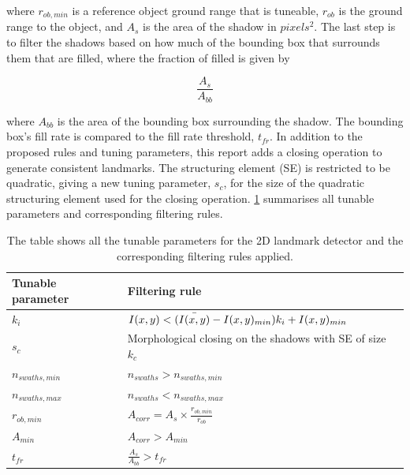 where $r_{ob, min}$ is a reference object ground range that is tuneable, $r_{ob}$ is the ground range to the object, and $A_s$ is the area of the shadow in $pixels^2$. The last step is to filter the shadows based on how much of the bounding box that surrounds them that are filled, where the fraction of filled is given by

\begin{equation}
    \frac{A_s}{A_{bb}}
    \label{eq:fill_rate_bb}
\end{equation}

where $A_{bb}$ is the area of the bounding box surrounding the shadow. The bounding box's fill rate is compared to the fill rate threshold, $t_{fr}$. In addition to the proposed rules and tuning parameters, this report adds a closing operation to generate consistent landmarks. The structuring element (SE) is restricted to be quadratic, giving a new tuning parameter, $s_c$, for the size of the quadratic structuring element used for the closing operation. \cref{tab:2D_tuning_rules} summarises all tunable parameters and corresponding filtering rules. 

\begin{table}
    \begin{center}
    \caption{The table shows all the tunable parameters for the 2D landmark detector and the corresponding filtering rules applied.}
    \begin{tabular}{ll}
        \hline
        \textbf{Tunable parameter} & \textbf{Filtering rule}                            \\ \hline
        $k_i$             & $I(x,y) < (\Bar{I(x,y)} - I(x,y)_{min}) k_i + I(x,y)_{min}$ \\ 
        $s_c$             & Morphological closing on the shadows with SE of size $k_c$  \\ 
        $n_{swaths,min}$  & $n_{swaths} > n_{swaths,min}$                               \\ 
        $n_{swaths,max}$  & $n_{swaths} < n_{swaths,max}$                               \\ 
        $r_{ob,min}$      & $A_{corr} = A_s \times \frac{r_{ob,min}}{r_{ob}}$           \\ 
        $A_{min}$         & $A_{corr} > A_{min}$                                        \\ 
        $t_{fr}$          & $\frac{A_s}{A_{bb}} > t_{fr}$                               \\ 
        \hline
    \end{tabular}
    \end{center}
    \label{tab:2D_tuning_rules}
\end{table}

